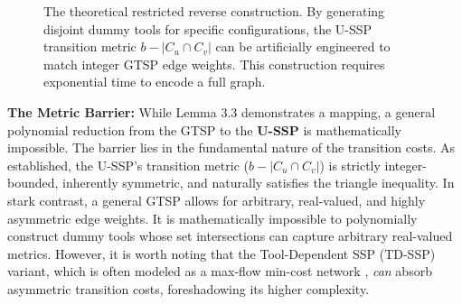 \documentclass[12pt]{article}
\begin{document}
\begin{figure}[h!]
	\centering
	\caption{The theoretical restricted reverse construction. By generating disjoint dummy tools for specific configurations, the U-SSP transition metric $b - |C_u \cap C_v|$ can be artificially engineered to match integer GTSP edge weights. This construction requires exponential time to encode a full graph.}
	\label{fig:dummy_tools}
\end{figure}



\textbf{The Metric Barrier:} While Lemma 3.3 demonstrates a mapping, a general polynomial reduction from the GTSP to the \textbf{U-SSP} is mathematically impossible. The barrier lies in the fundamental nature of the transition costs. As established, the U-SSP's transition metric ($b - |C_u \cap C_v|$) is strictly integer-bounded, inherently symmetric, and naturally satisfies the triangle inequality. In stark contrast, a general GTSP allows for arbitrary, real-valued, and highly asymmetric edge weights. It is mathematically impossible to polynomially construct dummy tools whose set intersections can capture arbitrary real-valued metrics. However, it is worth noting that the Tool-Dependent SSP (TD-SSP) variant, which is often modeled as a max-flow min-cost network \citep{Privault1995}, \textit{can} absorb asymmetric transition costs, foreshadowing its higher complexity.
\end{document}
